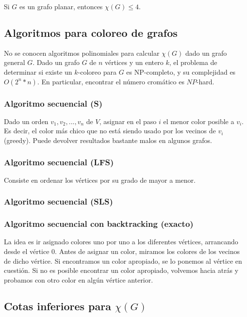 Si $G$ es un grafo planar, entonces $\chi(G) \leq 4$.

\subsection{Algoritmos para coloreo de grafos}

No se conocen algoritmos polinomiales para calcular $\chi(G)$ dado un grafo general $G$. Dado un grafo $G$ de $n$ v\'ertices y un entero $k$, el problema de determinar si existe un $k$-coloreo para $G$ es NP-completo, y su complejidad es $O(2^n * n)$. En particular, encontrar el n\'umero crom\'atico es $NP$-hard.

\newpage
\subsubsection{Algoritmo secuencial (S)}

Dado un orden $v_1, v_2, ..., v_n$ de $V$, asignar en el paso $i$ el menor color posible a $v_i$. Es decir, el color m\'as chico que no est\'a siendo usado por los vecinos de $v_i$ (greedy). Puede devolver resultados bastante malos en algunos grafos.

\subsubsection{Algoritmo secuencial (LFS)}

Consiste en ordenar los v\'ertices por su grado de mayor a menor.

\subsubsection{Algoritmo secuencial (SLS)}

\subsubsection{Algoritmo secuencial con backtracking (exacto)}

La idea es ir asignado colores uno por uno a los diferentes v\'ertices, arrancando desde el v\'ertice 0. Antes de asignar un color, miramos los colores de los vecinos de dicho v\'ertice. Si encontramos un color apropiado, se lo ponemos al v\'ertice en cuesti\'on. Si no es posible encontrar un color apropiado, volvemos hacia atr\'as y probamos con otro color en alg\'un v\'ertice anterior.

\subsection{Cotas inferiores para $\chi(G)$}

